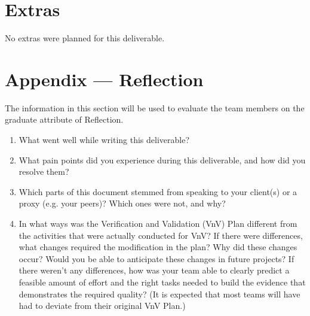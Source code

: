 \documentclass[12pt, titlepage]{article}
\begin{document}
\section{Extras}

No extras were planned for this deliverable.




\newpage{}
\section*{Appendix --- Reflection}

The information in this section will be used to evaluate the team members on the
graduate attribute of Reflection.



\begin{enumerate}
  \item What went well while writing this deliverable?
  \item What pain points did you experience during this deliverable, and how
        did you resolve them?
  \item Which parts of this document stemmed from speaking to your client(s) or
        a proxy (e.g. your peers)? Which ones were not, and why?
  \item In what ways was the Verification and Validation (VnV) Plan different
        from the activities that were actually conducted for VnV?  If there were
        differences, what changes required the modification in the plan?  Why did
        these changes occur?  Would you be able to anticipate these changes in
        future projects?  If there weren't any differences, how was your team
        able to clearly predict a feasible amount of effort and the right tasks
        needed to build the evidence that demonstrates the required quality?
        (It is expected that most teams will have had to deviate from their
        original VnV Plan.)
\end{enumerate}
\end{document}
